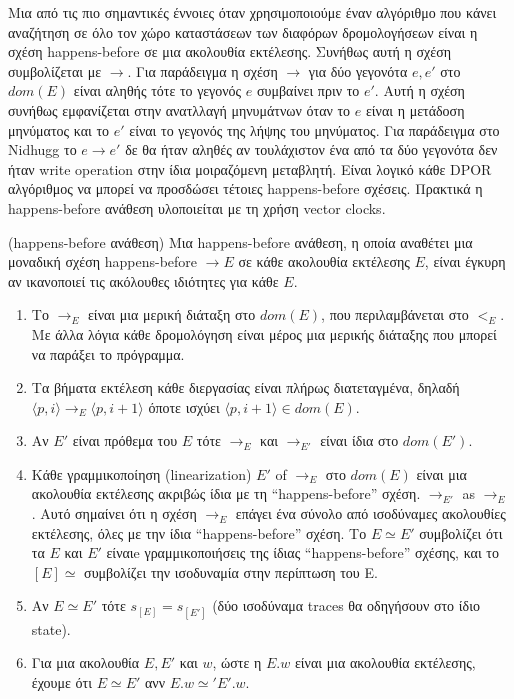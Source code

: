 Μια από τις πιο σημαντικές έννοιες όταν χρησιμοποιούμε έναν αλγόριθμο που κάνει αναζήτηση σε όλο τον χώρο καταστάσεων των διαφόρων δρομολογήσεων είναι η σχέση
happens-before σε μια ακολουθία εκτέλεσης. Συνήθως αυτή η σχέση συμβολίζεται με $\rightarrow$. Για παράδειγμα η σχέση $\rightarrow$ 
για δύο γεγονότα $e,e'$ στο $dom(E)$ είναι αληθής τότε το γεγονός $e$ συμβαίνει πριν το $e'$. Αυτή η σχέση συνήθως εμφανίζεται στην ανατλλαγή μηνυμάτνων όταν το  $e$ 
είναι η μετάδοση μηνύματος και το $e'$ είναι το γεγονός της λήψης του μηνύματος. Για παράδειγμα στο Nidhugg το $e \rightarrow e'$ δε θα ήταν αληθές αν τουλάχιστον ένα από τα δύο γεγονότα
δεν ήταν write operation στην ίδια μοιραζόμενη μεταβλητή. Είναι λογικό κάθε DPOR αλγόριθμος να μπορεί να προσδώσει τέτοιες happens-before σχέσεις. 
Πρακτικά η happens-before ανάθεση υλοποιείται με τη χρήση vector clocks.

\begin{definition}{(happens-before ανάθεση)}
    Μια happens-before ανάθεση, η οποία αναθέτει μια μοναδική σχέση
    happens-before $\rightarrow E$ σε κάθε ακολουθία εκτέλεσης
    $E$, είναι έγκυρη αν ικανοποιεί τις ακόλουθες ιδιότητες για κάθε $E$.
    \begin{enumerate}
        \item Το $\rightarrow_{E}$ είναι μια μερική διάταξη στο $dom(E)$, που περιλαμβάνεται στο $<_E$. Με άλλα λόγια κάθε δρομολόγηση είναι μέρος μια μερικής διάταξης που μπορεί να παράξει το πρόγραμμα.
        \item Τα βήματα εκτέλεση κάθε διεργασίας είναι πλήρως διατεταγμένα, δηλαδή
        $\langle p,i \rangle \rightarrow_E \langle p,i+1 \rangle$ όποτε ισχύει $\langle p, i+1 \rangle \in dom(E)$.
        \item Αν $E'$ είναι πρόθεμα του $E$ τότε $\rightarrow_E$ και $\rightarrow_{E'}$ είναι ίδια στο $dom(E')$.
        \item Κάθε γραμμικοποίηση (linearization) $E'$ of $\rightarrow_E$ στο $dom(E)$ είναι μια ακολουθία εκτέλεσης ακριβώς ίδια με τη “happens-before” σχέση.
$\rightarrow_{E'}$ as $\rightarrow_E$. Αυτό σημαίνει ότι η σχέση $\rightarrow_E$ επάγει ένα σύνολο
από ισοδύναμες ακολουθίες εκτέλεσης, όλες με την ίδια “happens-before” σχέση. 
Το $E \simeq E'$ συμβολίζει ότι τα $E$ και $E'$ είναιe
γραμμικοποιήσεις της ίδιας “happens-before” σχέσης, και το $[E] \simeq$ 
συμβολίζει την ισοδυναμία στην περίπτωση του E.
    \item Αν $E \simeq E'$ τότε $s_{[E]} = s_{[E']}$ (δύο ισοδύναμα traces θα οδηγήσουν στο ίδιο state).
    \item Για μια ακολουθία $E, E'$ και $w$, ώστε η $E.w$  είναι μια ακολουθία εκτέλεσης, έχουμε ότι $E \simeq E'$  ανν $E.w \simeq' E'.w$.
    \end{enumerate}
\end{definition}

